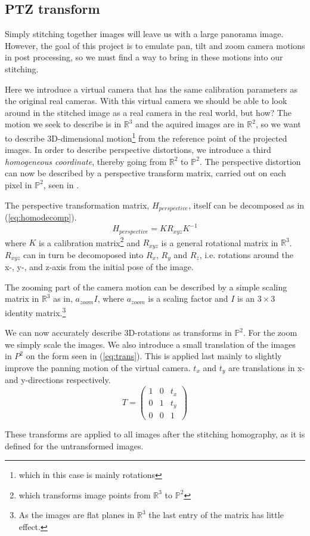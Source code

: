 \subsection{PTZ transform}
	Simply stitching together images will leave us with a large panorama image. However, the goal of this project is to emulate pan, tilt and zoom camera motions in post processing, so we must find a way to bring in these motions into our stitching.

	Here we introduce a virtual camera that has the same calibration parameters as the original real cameras. 
	With this virtual camera we should be able to look around in the stitched image as a real camera in the real world, but how? 
	The motion we seek to describe is in $\mathbb{R}^3$ and the aquired images are in $\mathbb{R}^2$, so we want to describe 3D-dimensional motion\footnote{which in this case is mainly rotations} from the reference point of the projected images. 
	In order to describe perspective distortions, we introduce a third \emph{homogeneous coordinate}, thereby going from $\mathbb{R}^2$ to $\mathbb{P}^2$. 
	The perspective distortion can now be described by a perspective transform matrix, carried out on each pixel in $\mathbb{P}^2$, seen in \cite{hartley2003Multiple}.

	The perspective transformation matrix, $H_{perspective}$, itself can be decomposed as in (\ref{eq:homodecomp}).
	\begin{equation}
		H_{perspective}=KR_{xyz}K^{-1}
		\label{eq:homodecomp}
	\end{equation}
	where $K$ is a calibration matrix\footnote{which transforms image points from $\mathbb{R}^3$ to $\mathbb{P}^2$} and $R_{xyz}$ is a general rotational matrix in $\mathbb{R}^3$.
$R_{xyz}$ can in turn be decomoposed into $R_x$, $R_y$ and $R_z$, i.e. rotations around the x-, y-, and z-axis from the initial pose of the image.

	The zooming part of the camera motion can be described by a simple scaling matrix in $\mathbb{R}^3$ as in, $a_{zoom}I$, where $a_{zoom}$ is a scaling factor and $I$ is an $3 \times 3$ identity matrix.\footnote{As the images are flat planes in $\mathbb{R}^3$ the last entry of the matrix has little effect.}

	We can now accurately describe 3D-rotations as transforms in $\mathbb{P}^2$. For the zoom we simply scale the images.
	We also introduce a small translation of the images in $P^2$ on the form seen in (\ref{eq:trans}). 
	This is applied last mainly to slightly improve the panning motion of the virtual camera. 
	$t_x$ and $t_y$ are translations in x- and y-directions respectively.
\begin{equation}
	T=\begin{pmatrix}
		1 & 0 & t_x \\
		0 & 1 & t_y \\
		0 & 0 & 1
	\end{pmatrix}
	\label{eq:trans}
\end{equation}

These transforms are applied to all images after the stitching homography, as it is defined for the untransformed images.
